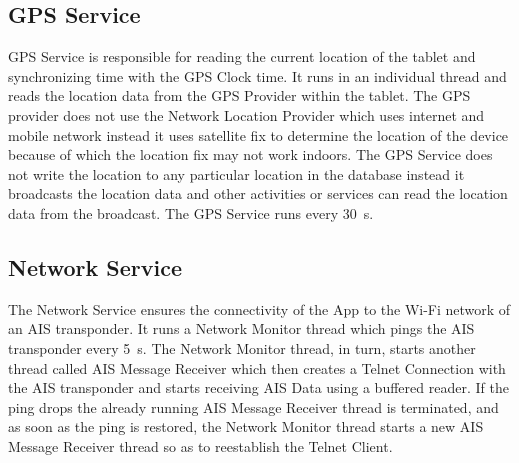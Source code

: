 \subsection{GPS Service}
\label{sec:sec5_2_1}
\noindent
%
GPS Service is responsible for reading the current location of the tablet and synchronizing time with the GPS Clock time. It runs in an individual thread and reads the location data from the GPS Provider within the tablet. The GPS provider does not use the Network Location Provider which uses internet and mobile network instead it uses satellite fix to determine the location of the device because of which the location fix may not work indoors.
\newline
\noindent
The GPS Service does not write the location to any particular location in the database instead it broadcasts the location data and other activities or services can read the location data from the broadcast. The GPS Service runs every \SI{30}{\second}.
%
\subsection{Network Service}
\label{sec:sec5_2_2}
\noindent
%
The Network Service ensures the connectivity of the App to the Wi-Fi network of an AIS transponder. It runs a Network Monitor thread which pings the AIS transponder every \SI{5}{\second}. The Network Monitor thread, in turn, starts another thread called AIS Message Receiver which then creates a Telnet Connection with the AIS transponder and starts receiving AIS Data using a buffered reader. 
\newline
\noindent
If the ping drops the already running AIS Message Receiver thread is terminated, and as soon as the ping is restored, the Network Monitor thread starts a new AIS Message Receiver thread so as to reestablish the Telnet Client. 
%
